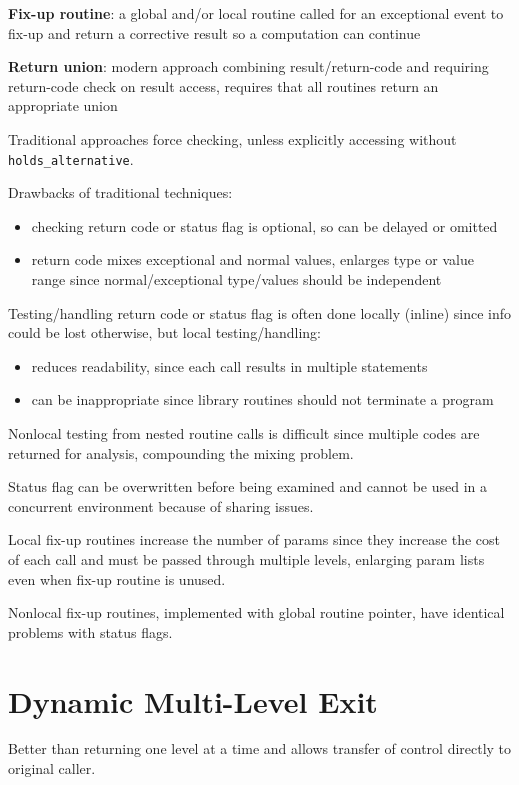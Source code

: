 \documentclass[11pt]{article}
\begin{document}
\textbf{Fix-up routine}: a global and/or local routine called for an exceptional event to fix-up and return
a corrective result so a computation can continue

\textbf{Return union}: modern approach combining result/return-code and requiring return-code check on result
access, requires that all routines return an appropriate union

Traditional approaches force checking, unless explicitly accessing without \texttt{holds\_alternative}.

Drawbacks of traditional techniques:
\begin{itemize}
\item checking return code or status flag is optional, so can be delayed or omitted
\item return code mixes exceptional and normal values, enlarges type or value range since normal/exceptional
type/values should be independent
\end{itemize}

Testing/handling return code or status flag is often done locally (inline) since info could be lost
otherwise, but local testing/handling:
\begin{itemize}
\item reduces readability, since each call results in multiple statements
\item can be inappropriate since library routines should not terminate a program
\end{itemize}

Nonlocal testing from nested routine calls is difficult since multiple codes are returned for analysis,
compounding the mixing problem.

Status flag can be overwritten before being examined and cannot be used in a concurrent environment
because of sharing issues.

Local fix-up routines increase the number of params since they increase the cost of each call and
must be passed through multiple levels, enlarging param lists even when fix-up routine is unused.

Nonlocal fix-up routines, implemented with global routine pointer, have identical problems with
status flags.
\section{Dynamic Multi-Level Exit}
\label{sec:org07ff0a9}
Better than returning one level at a time and allows transfer of control directly to original caller.
\end{document}
